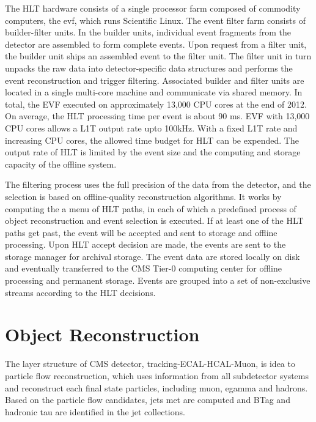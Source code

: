 The HLT hardware consists of a single processor farm composed of commodity computers, the \acrfull{evf}, which runs Scientific Linux. The event filter farm consists of builder-filter units. In the builder units, individual event fragments from the detector are assembled to form complete events. Upon request from a filter unit, the builder unit ships an assembled event to the filter unit. The filter unit in turn unpacks the raw data into detector-specific data structures and performs the event reconstruction and trigger filtering. Associated builder and filter units are located in a single multi-core machine and communicate via shared memory. In total, the EVF executed on approximately 13,000 CPU cores at the end of 2012. On average, the HLT processing time per event is about 90 ms. EVF with 13,000 CPU cores allows a L1T output rate upto 100kHz. With a fixed L1T rate and increasing CPU cores, the allowed time budget for HLT can be expended. The output rate of HLT is limited by the event size and the computing and storage capacity of the offline system.

The filtering process uses the full precision of the data from the detector, and the selection is based on offline-quality reconstruction algorithms. It works by computing the a menu of HLT paths, in each of which a predefined process of object reconstruction and event selection is executed. If at least one of the HLT paths get past, the event will be accepted and sent to storage and offline processing. Upon HLT accept decision are made, the events are sent to the storage manager for archival storage. The event data are stored locally on disk and eventually transferred to the CMS Tier-0 computing center for offline processing and permanent storage. Events are grouped into a set of non-exclusive streams according to the HLT decisions.






\section{Object Reconstruction}
\label{sec:exp:reco}

The layer structure of CMS detector, tracking-ECAL-HCAL-Muon, is idea to particle flow reconstruction, which uses information from all subdetector systems and reconstruct each final state particles, including muon, egamma and hadrons. Based on the particle flow candidates, jets met are computed and BTag and hadronic tau are identified in the jet collections. 

